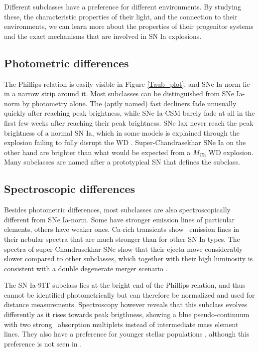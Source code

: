 \documentclass[a4paper,oneside,12pt, class=Latex/Classes/PhDthesisPSnPDF, crop=false]{standalone}
\begin{document}
Different subclasses have a preference for different environments. By studying these, the characteristic properties of their light, and the connection to their environments, we can learn more about the properties of their progenitor systems and the exact mechanisms that are involved in SN Ia explosions.


\subsection{Photometric differences}
The Phillips relation is easily visible in Figure \ref{Taub_plot}, and SNe Ia-norm lie in a narrow strip around it. Most subclasses can be distinguished from SNe Ia-norm by photometry alone. The (aptly named) fast decliners fade unusually quickly after reaching peak brightness, while SNe Ia-CSM barely fade at all in the first few weeks after reaching their peak brightness. SNe Iax never reach the peak brightness of a normal SN Ia, which in some models is explained through the explosion failing to fully disrupt the WD \citep{Iax_model_1, Iax_model_2}. Super-Chandrasekhar SNe Ia on the other hand are brighter than what would be expected from a $M_\text{Ch}$ WD explosion. Many subclasses are named after a prototypical SN that defines the subclass.


\subsection{Spectroscopic differences}
Besides photometric differences, most subclasses are also spectroscopically different from SNe Ia-norm. Some have stronger emission lines of particular elements, others have weaker ones. Ca-rich transients \citep[e.g.][]{Ca-rich_2010, Ca_rich_2012, Ca-rich_rate} show \CaII\ emission lines in their nebular spectra that are much stronger than for other SN Ia types. The spectra of super-Chandrasekhar SNe show that their ejecta move considerably slower compared to other subclasses, which together with their high luminosity is consistent with a double degenerate merger scenario \citep{2003fg_SuperCh, 06gz_SuperCh, 09dc_SuperCh}.

The SN Ia-91T subclass lies at the bright end of the Phillips relation, and thus cannot be identified photometrically but can therefore be normalized and used for distance measurements. Spectroscopy however reveals that this subclass evolves differently as it rises towards peak brigthness, showing a blue pseudo-continuum with two strong \FeIII\ absorption multiplets instead of intermediate mass element lines. They also have a preference for younger stellar populations \citep{Filippenko_91t, 91T}, although this preference is not seen in \citet{DR2_diversity}.
\end{document}

